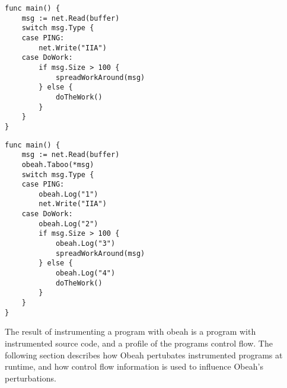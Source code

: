 \begin{lstlisting}[caption={source code pre-instrumentation},label={lst:pre-instrumentation}]
func main() {
    msg := net.Read(buffer)
    switch msg.Type {
    case PING:
        net.Write("IIA")
    case DoWork:
        if msg.Size > 100 {
            spreadWorkAround(msg)
        } else {
            doTheWork()
        }
    }
}
\end{lstlisting}

\begin{lstlisting}[label={lst:post-instrumentation}, caption={Source code post instrumentation}]
func main() {
    msg := net.Read(buffer)
    obeah.Taboo(*msg)
    switch msg.Type {
    case PING:
        obeah.Log("1")
        net.Write("IIA")
    case DoWork:
        obeah.Log("2")
        if msg.Size > 100 {
            obeah.Log("3")
            spreadWorkAround(msg)
        } else {
            obeah.Log("4")
            doTheWork()
        }
    }
}
\end{lstlisting}

The result of instrumenting a program with obeah is a program with instrumented
source code, and a profile of the programs control flow. The following section
describes how Obeah pertubates instrumented programs at runtime, and how
control flow information is used to influence Obeah's perturbations.

